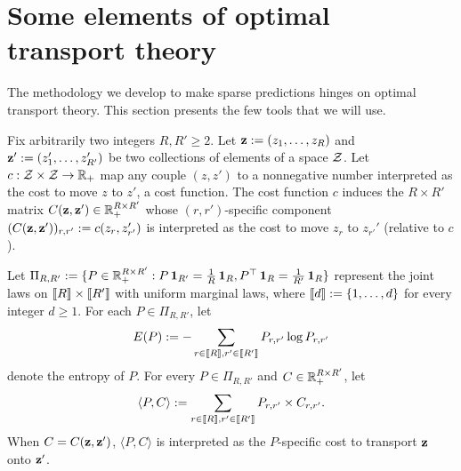 \section{Some elements of optimal transport theory}
\label{sec:elements:OT}

The  methodology we  develop  to  make sparse  predictions  hinges on  optimal
transport theory.  This section presents the few tools that we will use.

Fix     arbitrarily    two     integers     $R,    R'     \geq    2$.      Let
$\textbf{z} := (z_{1}, \ldots, z_{R})$ and $\textbf{z}' := (z_{1}', \ldots, z_{R'}')$ be two
collections     of      elements     of     a     space      $\mathcal{Z}$.      Let
$c : \mathcal{Z} \times \mathcal{Z} \to \mathbb{R}_{+}$ map any couple $(z,z')$ to a nonnegative
number interpreted as the cost to move  $z$ to $z'$, a cost function. The cost
function       $c$      induces       the       $R\times      R'$       matrix
$C(\textbf{z},\textbf{z}')  \in \mathbb{R}_{+}^{R  \times R'}$  whose $(r,r')$-specific  component
$(C(\textbf{z},\textbf{z}'))_{r,r'} := c(z_{r}, z_{r'}')$ is interpreted as the cost to move
$z_{r}$ to $z_{r'}'$ (relative to $c$).

Let
$\Pi_{R,R'}  := \{P  \in  \mathbb{R}_{+}^{R\times R'}  :  P\operatorname{\textbf{1}}_{R'} =  \tfrac{1}{R}
\operatorname{\textbf{1}}_{R},  P^{\top}\operatorname{\textbf{1}}_{R} =  \tfrac{1}{R'} \operatorname{\textbf{1}}_{R}\}$  represent the  joint
laws  on $\llbracket  R  \rrbracket \times  \llbracket  R'\rrbracket$ with  uniform  marginal laws,  where
$\llbracket  d \rrbracket  :=  \{1, \ldots,  d\}$  for  every integer  $d\geq  1$. For  each
$P \in \Pi_{R,R'}$, let
\begin{equation*}
  E(P):= -\sum_{r\in  \llbracket R  \rrbracket, r'  \in \llbracket R'  \rrbracket} P_{r,r'}  \log P_{r,r'}
\end{equation*}
denote   the   entropy   of   $P$.   For  every   $P   \in   \Pi_{R,R'}$   and
$C \in \mathbb{R}_{+}^{R\times R'}$, let
\begin{equation*}
  \langle P,  C\rangle  := \sum_{r\in \llbracket  R \rrbracket, r'  \in \llbracket  R' \rrbracket}
  P_{r,r'} \times C_{r,r'}. 
\end{equation*}
When  $C  =  C(\textbf{z},\textbf{z}')$,  $\langle   P,  C\rangle$  is  interpreted  as  the
$P$-specific cost to transport $\textbf{z}$ onto $\textbf{z}'$.

